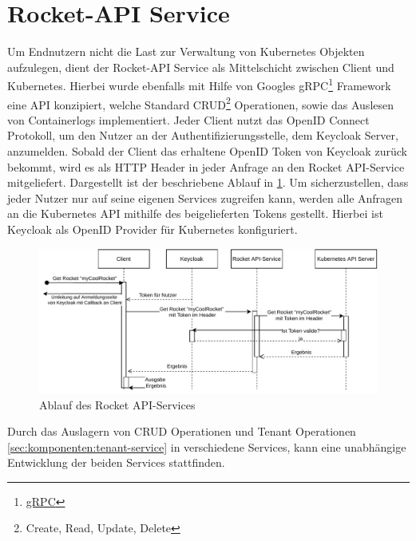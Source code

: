 \section{Rocket-API Service}
\label{sec:komponenten:rocket-api-service}
Um Endnutzern nicht die Last zur Verwaltung von Kubernetes Objekten aufzulegen, dient der Rocket-API Service als Mittelschicht zwischen
Client und Kubernetes. Hierbei wurde ebenfalls mit Hilfe von Googles gRPC\footnote{\href{https://grpc.io/}{gRPC}} Framework
eine API konzipiert, welche Standard CRUD\footnote{Create, Read, Update, Delete} Operationen, sowie das Auslesen
von Containerlogs implementiert.
Jeder Client nutzt das OpenID Connect Protokoll, um den Nutzer an der Authentifizierungsstelle, dem Keycloak
Server, anzumelden. Sobald der Client das erhaltene OpenID Token von Keycloak zurück bekommt,
wird es als HTTP Header in jeder Anfrage an den Rocket API-Service mitgeliefert.
Dargestellt ist der beschriebene Ablauf in \ref{fig:rocket-api-service-flow}.
Um sicherzustellen, dass jeder Nutzer nur auf seine eigenen Services zugreifen kann, 
werden alle Anfragen an die Kubernetes API mithilfe des beigelieferten Tokens gestellt.
Hierbei ist Keycloak als OpenID Provider für Kubernetes konfiguriert.

\begin{figure}[h]
  \centering
  \includegraphics[height=0.5\textwidth]{gfx/chapters/3_komponenten/api-service-flow.pdf}
  \caption{Ablauf des Rocket API-Services}
  \label{fig:rocket-api-service-flow}
\end{figure}

Durch das Auslagern von CRUD Operationen und Tenant Operationen \ref{sec:komponenten:tenant-service} in
verschiedene Services, kann eine unabhängige Entwicklung der beiden Services stattfinden.